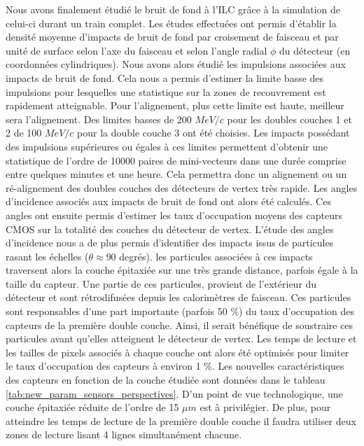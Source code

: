   Nous avons finalement \'etudi\'e le bruit de fond \`a l'ILC gr\^ace \`a la simulation de celui-ci durant un train complet. Les \'etudes effectu\'ees ont permis d'\'etablir la densit\'e moyenne d'impacts de bruit de fond par croisement de faisceau et par unit\'e de surface selon l'axe du faisceau et selon l'angle radial $\phi$ du d\'etecteur (en coordonn\'ees cylindriques). Nous avons alors \'etudi\'e les impulsions associ\'ees aux impacts de bruit de fond. Cela nous a permis d'estimer la limite basse des impulsions pour lesquelles une statistique sur la zones de recouvrement est rapidement atteignable. Pour l'alignement, plus cette limite est haute, meilleur sera l'alignement. Des limites basses de 200 $MeV/c$ pour les doubles couches 1 et 2 de 100 $MeV/c$ pour la double couche 3 ont \'et\'e choisies. Les impacts poss\'edant des impulsions sup\'erieures ou \'egales \`a ces limites permettent d'obtenir une statistique de l'ordre de 10000 paires de mini-vecteurs dans une dur\'ee comprise entre quelques minutes et une heure. Cela permettra donc un alignement ou un r\'e-alignement des doubles couches des d\'etecteurs de vertex tr\`es rapide. Les angles d'incidence associ\'es aux impacts de bruit de fond ont alors \'et\'e calcul\'es. Ces angles ont ensuite permis d'estimer les taux d'occupation moyens des capteurs CMOS sur la totalit\'e des couches du d\'etecteur de vertex. L'\'etude des angles d'incidence nous a de plus permis d'identifier des impacts issus de particules rasant les \'echelles ($\theta \approx 90$ degr\'es). les particules associ\'ees \`a ces impacts traversent alors la couche \'epitaxi\'ee sur une tr\`es grande distance, parfois \'egale \`a la taille du capteur. Une partie de ces particules, provient de l'ext\'erieur du d\'etecteur et sont r\'etrodifus\'ees depuis les calorim\`etres de faisceau. Ces particules sont responsables d'une part importante (parfois 50 $\%$) du taux d'occupation des capteurs de la premi\`ere double couche. Ainsi, il serait b\'en\'efique de soustraire ces particules avant qu'elles atteignent le d\'etecteur de vertex. Les temps de lecture et les tailles de pixels associ\'es \`a chaque couche ont alors \'et\'e optimisés pour limiter le taux d'occupation des capteurs \`a environ 1 $\%$. Les nouvelles caract\'eristiques des capteurs en fonction de la couche \'etudi\'ee sont donn\'ees dans le tableau \ref{tab:new_param_sensors_perspectives}. D'un point de vue technologique, une couche \'epitaxi\'ee r\'eduite de l'ordre de 15 $\mu m$ est \`a privil\'egier. De plus, pour atteindre les temps de lecture de la premi\`ere double couche il faudra utiliser deux zones de lecture lisant 4 lignes simultanément chacune.
  
